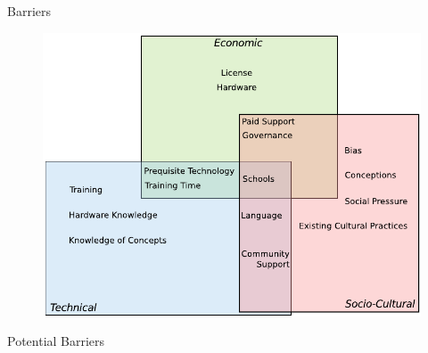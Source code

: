 \documentclass{beamer}
\begin{document}
\begin{frame}{Barriers}
	\begin{figure}
  	\centering

  		\includegraphics[width=1\textwidth]{barriers.pdf}
	\end{figure}
\end{frame}

\begin{frame}{Potential Barriers}
\vspace{-.3in}
	\begin{center}
		\begin{scriptsize}
		\end{scriptsize}
	\end{center}
\end{frame}
\end{document}
